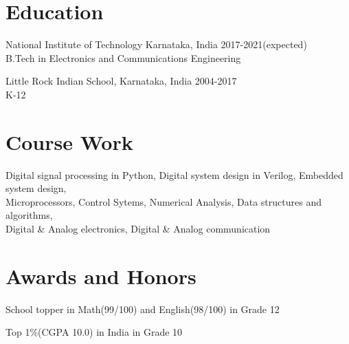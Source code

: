\documentclass[letterpaper]{article}
\renewenvironment{itemize}{
  \begin{list}{}{
    \setlength{\leftmargin}{1.5em}
  }
}{
  \end{list}
}
\begin{document}
\section*{Education}
  \begin{itemize}
    \item National Institute of Technology Karnataka, India\hfill
    \textcolor{black!80}{\small{2017-2021(expected)}}
    \\
    \textcolor{black!80}{\small{B.Tech in Electronics and Communications Engineering}}

    \item Little Rock Indian School, Karnataka, India\hfill
    \textcolor{black!80}{\small{2004-2017}}
    \\
    \textcolor{black!80}{\small{K-12}}
  \end{itemize}


\section*{Course Work}
  Digital signal processing in Python, Digital system design in Verilog, Embedded system design, \\
  Microprocessors, Control Sytems, Numerical Analysis, Data structures and algorithms, \\
  Digital \& Analog electronics, Digital \& Analog communication


\section*{Awards and Honors}
\begin{itemize}
  \item School topper in Math(99/100) and English(98/100) in Grade 12
  \item Top 1\%(CGPA 10.0) in India in Grade 10
\end{itemize}


\end{document}
